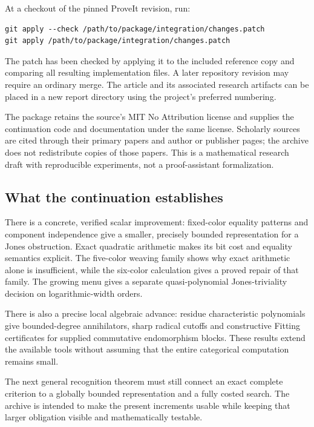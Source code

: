 At a checkout of the pinned ProveIt revision, run:
\begin{lstlisting}
git apply --check /path/to/package/integration/changes.patch
git apply /path/to/package/integration/changes.patch
\end{lstlisting}
The patch has been checked by applying it to the included reference copy
and comparing all resulting implementation files. A later repository
revision may require an ordinary merge. The article and its associated
research artifacts can be placed in a new report directory using the
project's preferred numbering.

The package retains the source's MIT No Attribution license and supplies
the continuation code and documentation under the same license.
Scholarly sources are cited through their primary papers and author or
publisher pages; the archive does not redistribute copies of those papers.
This is a mathematical research draft with reproducible experiments,
not a proof-assistant formalization.

\subsection{What the continuation establishes}

There is a concrete, verified scalar improvement: fixed-color equality
patterns and component independence give a smaller, precisely bounded
representation for a Jones obstruction. Exact quadratic arithmetic makes
its bit cost and equality semantics explicit. The five-color weaving family
shows why exact arithmetic alone is insufficient, while the six-color
calculation gives a proved repair of that family. The growing menu gives a
separate quasi-polynomial Jones-triviality decision on logarithmic-width
orders.

There is also a precise local algebraic advance: residue characteristic
polynomials give bounded-degree annihilators, sharp radical cutoffs and
constructive Fitting certificates for supplied commutative endomorphism
blocks. These results extend the available tools without assuming that the
entire categorical computation remains small.

The next general recognition theorem must still connect an exact complete
criterion to a globally bounded representation and a fully costed search.
The archive is intended to make the present increments usable while keeping
that larger obligation visible and mathematically testable.
